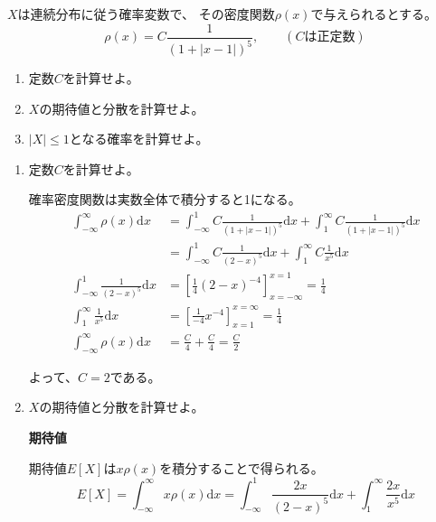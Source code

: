 \documentclass[12pt,b5paper]{ltjsarticle}
\begin{document}
$X$は連続分布に従う確率変数で、
その密度関数$\rho(x)$で与えられるとする。
\begin{equation}
 \rho(x) = C\frac{1}{(1+\lvert x-1 \rvert)^{5}}
  ,\qquad (Cは正定数)
\end{equation}

\begin{enumerate}
 \item
      定数$C$を計算せよ。

 \item
      $X$の期待値と分散を計算せよ。

 \item
      $\lvert X \rvert \leq 1$となる確率を計算せよ。
\end{enumerate}

\hrulefill

\begin{enumerate}
 \item
      定数$C$を計算せよ。

      \dotfill

      確率密度関数は実数全体で積分すると1になる。
      \begin{align}
       \int_{-\infty}^{\infty} \rho(x) \mathrm{d}x
        &= \int_{-\infty}^{1} C\frac{1}{(1+\lvert x-1 \rvert)^{5}} \mathrm{d}x
        + \int_{1}^{\infty} C\frac{1}{(1+\lvert x-1 \rvert)^{5}} \mathrm{d}x\\
        &= \int_{-\infty}^{1} C\frac{1}{(2-x)^{5}} \mathrm{d}x
        + \int_{1}^{\infty} C\frac{1}{x^{5}} \mathrm{d}x\\
       \int_{-\infty}^{1} \frac{1}{(2-x)^{5}} \mathrm{d}x
        &= \left[ \frac{1}{4}(2-x)^{-4} \right]_{x=-\infty}^{x=1} = \frac{1}{4}\\
       \int_{1}^{\infty} \frac{1}{x^{5}} \mathrm{d}x
        &= \left[ \frac{1}{-4}x^{-4} \right]_{x=1}^{x=\infty} = \frac{1}{4}\\
       \int_{-\infty}^{\infty} \rho(x) \mathrm{d}x
        &= \frac{C}{4} + \frac{C}{4} = \frac{C}{2}
      \end{align}

      よって、$C=2$である。


 \item
      $X$の期待値と分散を計算せよ。

      \dotfill

      \textbf{期待値}

      期待値$E[X]$は$x\rho(x)$を積分することで得られる。
      \begin{equation}
       E[X] = \int_{-\infty}^{\infty} x\rho(x) \mathrm{d}x
       = \int_{-\infty}^{1} \frac{2x}{(2-x)^{5}} \mathrm{d}x
        + \int_{1}^{\infty} \frac{2x}{x^{5}} \mathrm{d}x
      \end{equation}


\end{enumerate}
\end{document}
